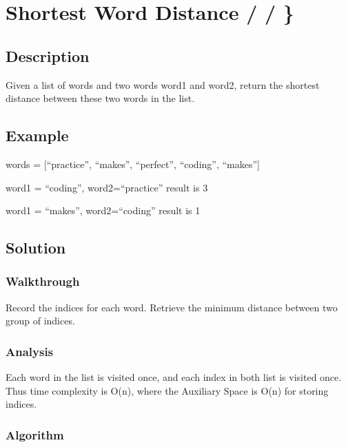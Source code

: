 \documentclass[]{book}
\begin{document}
\hypertarget{shortest-word-distance}{%
\section{Shortest Word Distance / / \}}\label{shortest-word-distance}}

\hypertarget{description-38}{%
\subsection{Description}\label{description-38}}

Given a list of words and two words word1 and word2, return the shortest distance between these two words in the list.

\hypertarget{example-37}{%
\subsection{Example}\label{example-37}}

words = {[}``practice'', ``makes'', ``perfect'', ``coding'', ``makes''{]}

word1 = ``coding'', word2=``practice'' result is 3

word1 = ``makes'', word2=``coding'' result is 1

\hypertarget{solution-30}{%
\subsection{Solution}\label{solution-30}}

\hypertarget{walkthrough-39}{%
\subsubsection{Walkthrough}\label{walkthrough-39}}

Record the indices for each word. Retrieve the minimum distance between two group of indices.

\hypertarget{analysis-42}{%
\subsubsection{Analysis}\label{analysis-42}}

Each word in the list is visited once, and each index in both list is visited once. Thus time complexity is O(n),
where the Auxiliary Space is O(n) for storing indices.

\hypertarget{algorithm-42}{%
\subsubsection{Algorithm}\label{algorithm-42}}
\end{document}
